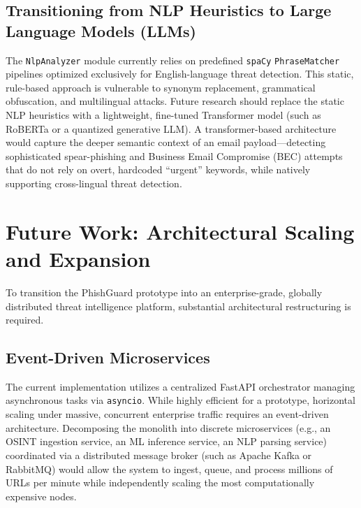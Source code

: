 \subsection{Transitioning from NLP Heuristics to Large Language
Models
(LLMs)}\label{transitioning-from-nlp-heuristics-to-large-language-models-llms}

The \texttt{NlpAnalyzer} module currently relies on predefined
\texttt{spaCy} \texttt{PhraseMatcher} pipelines optimized exclusively
for English-language threat detection. This static, rule-based approach
is vulnerable to synonym replacement, grammatical obfuscation, and
multilingual attacks. Future research should replace the static NLP
heuristics with a lightweight, fine-tuned Transformer model (such as
RoBERTa or a quantized generative LLM). A transformer-based architecture
would capture the deeper semantic context of an email
payload---detecting sophisticated spear-phishing and Business Email
Compromise (BEC) attempts that do not rely on overt, hardcoded
``urgent'' keywords, while natively supporting cross-lingual threat
detection.

\section{Future Work: Architectural Scaling and
Expansion}\label{future-work-architectural-scaling-and-expansion}

To transition the PhishGuard prototype into an enterprise-grade,
globally distributed threat intelligence platform, substantial
architectural restructuring is required.

\subsection{Event-Driven
Microservices}\label{event-driven-microservices}

The current implementation utilizes a centralized FastAPI orchestrator
managing asynchronous tasks via \texttt{asyncio}. While highly efficient
for a prototype, horizontal scaling under massive, concurrent enterprise
traffic requires an event-driven architecture. Decomposing the monolith
into discrete microservices (e.g., an OSINT ingestion service, an ML
inference service, an NLP parsing service) coordinated via a distributed
message broker (such as Apache Kafka or RabbitMQ) would allow the system
to ingest, queue, and process millions of URLs per minute while
independently scaling the most computationally expensive nodes.

